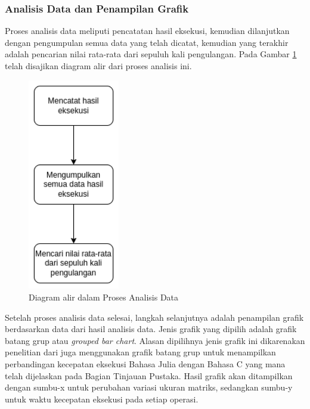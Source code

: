 \subsubsection{Analisis Data dan Penampilan Grafik}

Proses analisis data meliputi pencatatan hasil eksekusi, kemudian dilanjutkan
dengan pengumpulan semua data yang telah dicatat, kemudian yang terakhir adalah
pencarian nilai rata-rata dari sepuluh kali pengulangan. Pada Gambar
\ref{img:methods_analysist} telah disajikan diagram alir dari proses analisis
ini.

\begin{figure}[h]
  \centering
  \includegraphics[width=4cm, scale=1]{schema/langkah-3.drawio.png}
  \caption{Diagram alir dalam Proses Analisis Data}
  \label{img:methods_analysist}
\end{figure}

Setelah proses analisis data selesai, langkah selanjutnya adalah penampilan
grafik berdasarkan data dari hasil analisis data. Jenis grafik yang dipilih
adalah grafik batang grup atau \emph{grouped bar chart}. Alasan dipilihnya
jenis grafik ini dikarenakan penelitian dari
\cite{hunoldBenchmarkingJuliaCommunication2020} juga menggunakan grafik batang
grup untuk menampilkan perbandingan kecepatan eksekusi Bahasa Julia dengan
Bahasa C yang mana telah dijelaskan pada Bagian Tinjauan Pustaka. Hasil grafik
akan ditampilkan dengan sumbu-x untuk perubahan variasi ukuran matriks,
sedangkan sumbu-y untuk waktu kecepatan eksekusi pada setiap operasi.


